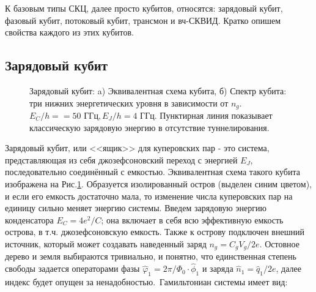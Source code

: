 К базовым типы СКЦ, далее просто кубитов, относятся: зарядовый кубит, фазовый кубит, потоковый кубит, трансмон и вч-СКВИД. Кратко опишем свойства каждого из этих кубитов.
\subsection{Зарядовый кубит}\label{charge_q}
	\begin{figure}[b]
		{ \raggedleft
			\hfill
			\def\svgwidth{2in}
			\fontsize{19pt}{19pt}\selectfont
			\hfill
			\def\svgwidth{4in}
			
			\hfill
		}
		\caption[Схема зарядового кубита и его спектр.]{Зарядовый кубит: a) Эквивалентная схема кубита, б) Спектр кубита: три нижних энергетических уровня в зависимости от $n_g$. $E_C/h=\!=\!50 \text{ ГГц}, E_J/h\!=\!4\text{ ГГц}$. Пунктирная линия показывает классическую зарядовую энергию в отсутствие туннелирования.}
		\label{img: CPB}
		
	\end{figure}
Зарядовый кубит, или <<ящик>> для куперовских пар - это система, представляющая из себя джозефсоновский переход с энергией $E_J$, последовательно соединённый с емкостью. Эквивалентная схема такого кубита изображена на Рис.\ref{img: CPB}. Образуется изолированный остров (выделен синим цветом), и если его емкость достаточно мала, то изменение числа куперовских пар на единицу сильно меняет энергию системы.  Введем зарядовую энергию конденсатора $E_C = 4e^2/C$; она включает в себя всю эффективную емкость острова, в т.ч. джозефсоновскую емкость. Также к острову подключен внешний источник, который может создавать наведенный заряд $n_g = C_gV_g/2e$.   Остовное дерево и земля выбираются тривиально, и понятно, что единственная степень свободы задается операторами фазы $\hat{\varphi}_1\!=\!2\pi/\Phi_0\!\cdot\!\hat{\phi}_1$ и заряда $\hat{n}_1\!=\!\hat{q}_1/2e$, далее индекс будет опущен за ненадобностью.~Гамильтониан системы имеет вид:
